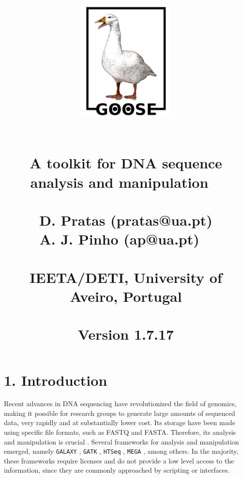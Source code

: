 \documentclass[11pt,journal,compsoc]{report}[1]
\begin{document}

\title{
%
\begin{figure}[h!]
\centerline{\includegraphics[width=5cm]{../imgs/logo.pdf}}
\label{logo}
\end{figure}
~\\
\textbf{A toolkit for DNA sequence\\ analysis and manipulation}
~\\~\\
\large
D. Pratas (pratas@ua.pt)\\
A. J. Pinho (ap@ua.pt)
~\\~\\
\small
IEETA/DETI, University of Aveiro, Portugal\\
~\\
Version 1.7.17
}
\date{}
\maketitle

\tableofcontents

\chapter*{1. Introduction}
\label{intro}

Recent advances in {DNA} sequencing have revolutionized the field of genomics,
making it possible for research groups to generate large amounts of sequenced
data, very rapidly and at substantially lower cost. Its storage have been
made using specific file formats, such as FASTQ and FASTA. Therefore, its
analysis and manipulation is crucial \cite{Buermans-2014a}. Several
frameworks for analysis and manipulation emerged, namely \texttt{GALAXY}
\cite{Giardine-2005a}, \texttt{GATK} \cite{DePristo-2011a}, \texttt{HTSeq}
\cite{Anders-2014a}, \texttt{MEGA} \cite{Kumar-2016a}, among others.
In the majority, these frameworks require licenses and do not provide
a low level access to the information, since they are commonly approached
by scripting or interfaces.
\end{document}
